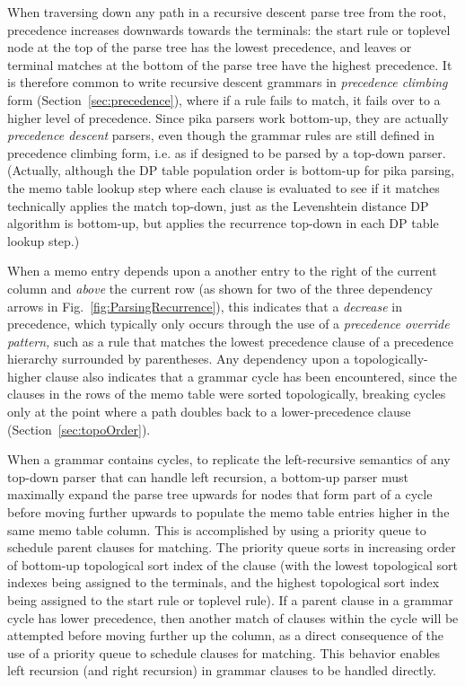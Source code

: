 \documentclass[manuscript,screen]{acmart}
\begin{document}
When traversing down any path in a recursive descent parse tree from the root, precedence increases downwards towards the terminals: the start rule or toplevel node at the top of the parse tree has the lowest precedence, and leaves or terminal matches at the bottom of the parse tree have the highest precedence. It is therefore common to write recursive descent grammars in \emph{precedence climbing} form (Section~\ref{sec:precedence}), where if a rule fails to match, it fails over to a higher level of precedence. Since pika parsers work bottom-up, they are actually \emph{precedence descent} parsers, even though the grammar rules are still defined in precedence climbing form, i.e. as if designed to be parsed by a top-down parser. (Actually, although the DP table population order is bottom-up for pika parsing, the memo table lookup step where each clause is evaluated to see if it matches technically applies the match top-down, just as the Levenshtein distance DP algorithm is bottom-up, but applies the recurrence top-down in each DP table lookup step.)

When a memo entry depends upon a another entry to the right of the current column and \emph{above} the current row (as shown for two of the three dependency arrows in Fig.~\ref{fig:ParsingRecurrence}), this indicates that a \emph{decrease} in precedence, which typically only occurs through the use of a \emph{precedence override pattern,} such as a rule that matches the lowest precedence clause of a precedence hierarchy surrounded by parentheses. Any dependency upon a topologically-higher clause also indicates that a grammar cycle has been encountered, since the clauses in the rows of the memo table were sorted topologically, breaking cycles only at the point where a path doubles back to a lower-precedence clause (Section~\ref{sec:topoOrder}).

When a grammar contains cycles, to replicate the left-recursive semantics of any top-down parser that can handle left recursion, a bottom-up parser must maximally expand the parse tree upwards for nodes that form part of a cycle before moving further upwards to populate the memo table entries higher in the same memo table column. This is accomplished by using a priority queue to schedule parent clauses for matching. The priority queue sorts in increasing order of bottom-up topological sort index of the clause (with the lowest topological sort indexes being assigned to the terminals, and the highest topological sort index being assigned to the start rule or toplevel rule). If a parent clause in a grammar cycle has lower precedence, then another match of clauses within the cycle will be attempted before moving further up the column, as a direct consequence of the use of a priority queue to schedule clauses for matching. This behavior enables left recursion (and right recursion) in grammar clauses to be handled directly.
\end{document}
